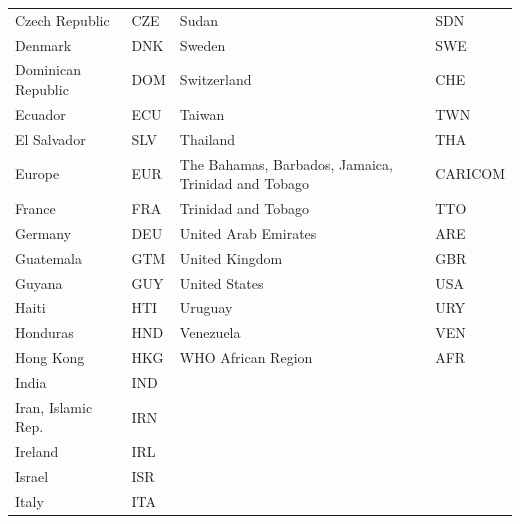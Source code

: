 \documentclass[12pt,english]{article}
\begin{document}
\begin{appendix}
\begin{tabularx}{\linewidth}{Z Y Z Y}
Czech Republic          & CZE          & Sudan                                               & SDN          \\
Denmark                 & DNK          & Sweden                                              & SWE          \\
Dominican Republic      & DOM          & Switzerland                                         & CHE          \\
Ecuador                 & ECU          & Taiwan                                              & TWN          \\
El Salvador             & SLV          & Thailand                                            & THA          \\
Europe                  & EUR          & The Bahamas, Barbados, Jamaica, Trinidad and Tobago & CARICOM      \\
France                  & FRA          & Trinidad and Tobago                                 & TTO          \\
Germany                 & DEU          & United Arab Emirates                                & ARE          \\
Guatemala               & GTM          & United Kingdom                                      & GBR          \\
Guyana                  & GUY          & United States                                       & USA          \\
Haiti                   & HTI          & Uruguay                                             & URY          \\
Honduras                & HND          & Venezuela                                           & VEN          \\
Hong Kong               & HKG          & WHO African Region                                  & AFR          \\
India                   & IND          &                                                     &              \\
Iran, Islamic Rep.      & IRN          &                                                     &              \\
Ireland                 & IRL          &                                                     &              \\
Israel                  & ISR          &                                                     &              \\
Italy                   & ITA          &                                                     &              \\ \bottomrule
\end{tabularx}




\end{appendix}
\end{document}
